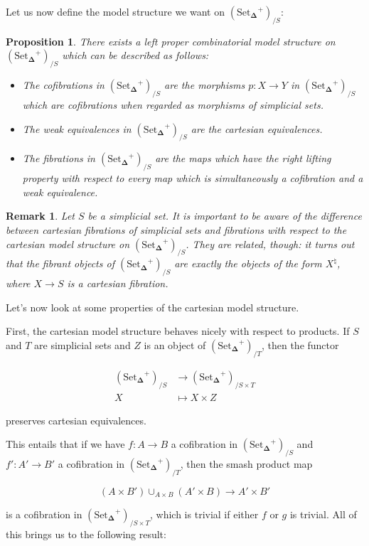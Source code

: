 \documentclass[12pt]{amsart}
\newcommand{\8}{\ensuremath{\infty}}
\newcommand{\SSet}{\ensuremath{\text{Set}_{\boldsymbol{\Delta}}}}
\newtheorem{proposition}{Proposition}
\newtheorem{remark}{Remark}
\begin{document}
Let us now define the model structure we want on $(\SSet^+)_{/S}$:
\begin{proposition}
  There exists a left proper combinatorial model structure on $(\SSet^+)_{/S}$ which can be described as follows:
  \begin{itemize}
    \item[(C)] The cofibrations in $(\SSet^+)_{/S}$ are the morphisms $p: X \rightarrow Y$ in $(\SSet^+)_{/S}$ which are cofibrations when regarded as morphisms of simplicial sets.
    \item[(W)] The weak equivalences in $(\SSet^+)_{/S}$ are the cartesian equivalences.
    \item[(F)] The fibrations in $(\SSet^+)_{/S}$ are the maps which have the right lifting property with respect to every map which is simultaneously a cofibration and a weak equivalence.
  \end{itemize}
\end{proposition}

\begin{remark}
  Let $S$ be a simplicial set. It is important to be aware of the difference between cartesian fibrations of simplicial sets and fibrations with respect to the cartesian model structure on $(\SSet^+)_{/S}$. They are related, though: it turns out that the fibrant objects of $(\SSet^+)_{/S}$ are exactly the objects of the form $X^\natural$, where $X \rightarrow S$ is a cartesian fibration.
\end{remark}

Let's now look at some properties of the cartesian model structure.

First, the cartesian model structure behaves nicely with respect to products. If $S$ and $T$ are simplicial sets and $Z$ is an object of $(\SSet^+)_{/T}$, then the functor

\begin{align*}
  (\SSet^+)_{/S} & \rightarrow (\SSet^+)_{/S\times T} \\
  X              & \mapsto X\times Z
\end{align*}

preserves cartesian equivalences.

This entails that if we have $f: A \rightarrow B$ a cofibration in $(\SSet^+)_{/S}$ and $f': A' \rightarrow B'$ a cofibration in $(\SSet^+)_{/T}$, then the smash product map

$$
  (A\times B')\displaystyle \cup_{A\times B}(A'\times B) \rightarrow A'\times B'
$$

is a cofibration in $(\SSet^+)_{/S\times T}$, which is trivial if either $f$ or $g$ is trivial. All of this brings us to the following result:
\end{document}
